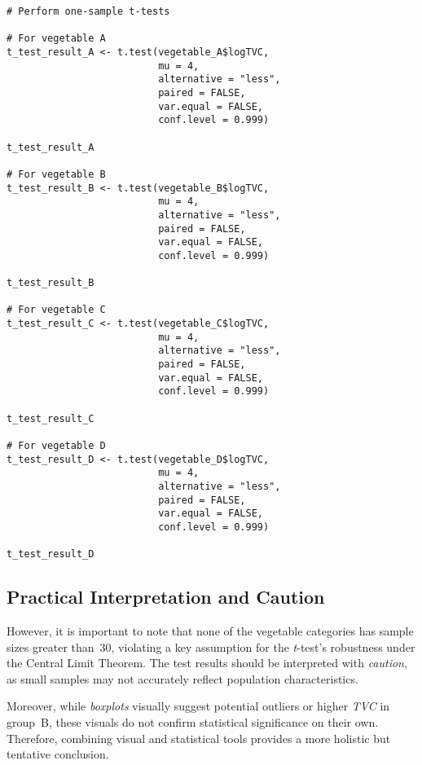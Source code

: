 \documentclass{article}
\begin{document}
\begin{verbatim}
# Perform one-sample t-tests

# For vegetable A
t_test_result_A <- t.test(vegetable_A$logTVC,
                          mu = 4,
                          alternative = "less",
                          paired = FALSE,
                          var.equal = FALSE,
                          conf.level = 0.999)

t_test_result_A

# For vegetable B
t_test_result_B <- t.test(vegetable_B$logTVC,
                          mu = 4,
                          alternative = "less",
                          paired = FALSE,
                          var.equal = FALSE,
                          conf.level = 0.999)

t_test_result_B

# For vegetable C
t_test_result_C <- t.test(vegetable_C$logTVC,
                          mu = 4,
                          alternative = "less",
                          paired = FALSE,
                          var.equal = FALSE,
                          conf.level = 0.999)

t_test_result_C

# For vegetable D
t_test_result_D <- t.test(vegetable_D$logTVC,
                          mu = 4,
                          alternative = "less",
                          paired = FALSE,
                          var.equal = FALSE,
                          conf.level = 0.999)

t_test_result_D
\end{verbatim}


\usepackage{ragged2e}   


\subsection*{Practical Interpretation and Caution}

\justifying          

\noindent              
However, it is important to note that none of the vegetable categories has sample sizes greater than~30, violating a key assumption for the \textit{t}-test’s robustness under the Central Limit Theorem. The test results should be interpreted with \textit{caution}, as small samples may not accurately reflect population characteristics.

\noindent              
Moreover, while \textit{boxplots} visually suggest potential outliers or higher \textit{TVC} in group~B, these visuals do not confirm statistical significance on their own. Therefore, combining visual and statistical tools provides a more holistic but tentative conclusion.
\end{document}
